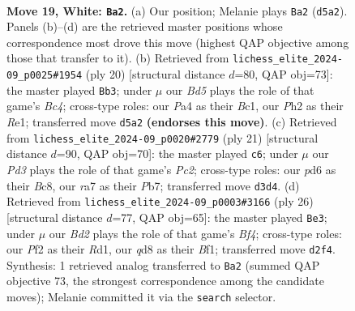\documentclass[11pt]{article}
\begin{document}
\clearpage

\begin{figure}[p]\centering
\begin{subfigure}{0.46\textwidth}\centering
\resizebox{\linewidth}{!}{%
\newchessgame
\chessboard[
  setfen={2bqn1r1/r3bpkp/p2p2p1/n1pBp3/Pp2P3/3P3N/1PPBQPPP/RN2R1K1 w - - 6 19},
  showmover=false,
  pgfstyle=straightmove, color=movearrow, markmove={d5-a2}
]}
\caption{}
\end{subfigure}\hfill
\begin{subfigure}{0.46\textwidth}\centering
\resizebox{\linewidth}{!}{%
\newchessgame
\chessboard[
  setfen={r1bq1rk1/pp3ppp/1bpp1nn1/4p3/1PB1P3/2PP1N2/P4PPP/R1BQRNK1 w - - 0 11},
  showmover=false,
  pgfstyle=straightmove, color=movearrow, markmove={c4-b3}
]}
\caption{}
\end{subfigure}
\\[4pt]
\begin{subfigure}{0.46\textwidth}\centering
\resizebox{\linewidth}{!}{%
\newchessgame
\chessboard[
  setfen={r1bq1rk1/bpp2ppp/3p1nn1/p3p3/2B1P3/2PP1NNP/PP3PP1/R1BQR1K1 b - - 6 11},
  showmover=false,
  pgfstyle=straightmove, color=movearrow, markmove={c7-c6}
]}
\caption{}
\end{subfigure}\hfill
\begin{subfigure}{0.46\textwidth}\centering
\resizebox{\linewidth}{!}{%
\newchessgame
\chessboard[
  setfen={r1b1k2r/1pqnppbn/p2p2p1/2pP2Pp/4PB1P/2N2P2/PPPQ4/1K1R1BNR w kq - 1 14},
  showmover=false,
  pgfstyle=straightmove, color=movearrow, markmove={f4-e3}
]}
\caption{}
\end{subfigure}
\caption{\textbf{Move 19, White: \texttt{Ba2}.} (a) Our position; Melanie plays \texttt{Ba2} (\texttt{d5a2}). Panels (b)--(d) are the retrieved master positions whose correspondence most drove this move (highest QAP objective among those that transfer to it). (b) Retrieved from \texttt{lichess\_elite\_2024-09\_p0025\#1954} (ply 20) [structural distance $d$=80, QAP obj=73]: the master played \texttt{Bb3}; under $\mu$ our \emph{Bd5} plays the role of that game's \emph{Bc4}; cross-type roles: our \emph{P}a4 as their \emph{B}c1, our \emph{P}h2 as their \emph{R}e1; transferred move \texttt{d5a2} \textbf{(endorses this move)}. (c) Retrieved from \texttt{lichess\_elite\_2024-09\_p0020\#2779} (ply 21) [structural distance $d$=90, QAP obj=70]: the master played \texttt{c6}; under $\mu$ our \emph{Pd3} plays the role of that game's \emph{Pc2}; cross-type roles: our \emph{p}d6 as their \emph{B}c8, our \emph{r}a7 as their \emph{P}b7; transferred move \texttt{d3d4}. (d) Retrieved from \texttt{lichess\_elite\_2024-09\_p0003\#3166} (ply 26) [structural distance $d$=77, QAP obj=65]: the master played \texttt{Be3}; under $\mu$ our \emph{Bd2} plays the role of that game's \emph{Bf4}; cross-type roles: our \emph{P}f2 as their \emph{R}d1, our \emph{q}d8 as their \emph{B}f1; transferred move \texttt{d2f4}. Synthesis: 1 retrieved analog transferred to \texttt{Ba2} (summed QAP objective 73, the strongest correspondence among the candidate moves); Melanie committed it via the \texttt{search} selector.}
\label{fig:thought-m36}
\end{figure}
\end{document}
